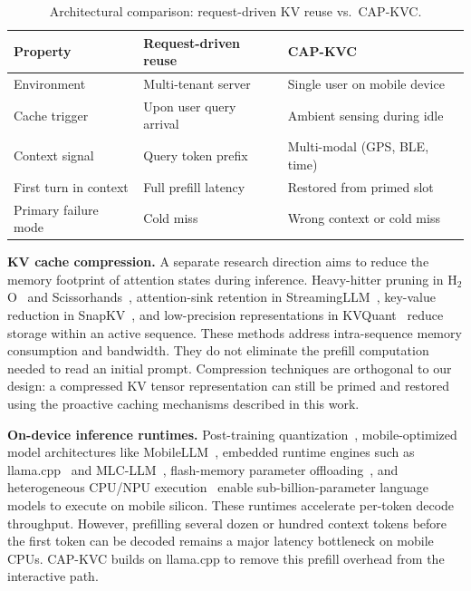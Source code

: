 \documentclass[conference]{IEEEtran}
\begin{document}
\begin{table}[t]
\centering
\caption{Architectural comparison: request-driven KV reuse vs.\ CAP-KVC.}
\label{tab:positioning}
\footnotesize
\setlength{\tabcolsep}{3pt}
\begin{tabular}{@{}p{}p{}p{}@{}}
\toprule
Property & Request-driven reuse & CAP-KVC \\
\midrule
Environment & Multi-tenant server & Single user on mobile device \\
Cache trigger & Upon user query arrival & Ambient sensing during idle \\
Context signal & Query token prefix & Multi-modal (GPS, BLE, time) \\
First turn in context & Full prefill latency & Restored from primed slot \\
Primary failure mode & Cold miss & Wrong context or cold miss \\
\bottomrule
\end{tabular}
\end{table}

\textbf{KV cache compression.}
A separate research direction aims to reduce the memory footprint of attention states during inference. Heavy-hitter pruning in H$_2$O~\cite{h2o} and Scissorhands~\cite{scissorhands}, attention-sink retention in StreamingLLM~\cite{streamingllm}, key-value reduction in SnapKV~\cite{snapkv}, and low-precision representations in KVQuant~\cite{kvquant} reduce storage within an active sequence. These methods address intra-sequence memory consumption and bandwidth. They do not eliminate the prefill computation needed to read an initial prompt. Compression techniques are orthogonal to our design: a compressed KV tensor representation can still be primed and restored using the proactive caching mechanisms described in this work.

\textbf{On-device inference runtimes.}
Post-training quantization~\cite{dettmers2022,frantar2022}, mobile-optimized model architectures like MobileLLM~\cite{mobilellm}, embedded runtime engines such as llama.cpp~\cite{llamacpp} and MLC-LLM~\cite{mlcllm}, flash-memory parameter offloading~\cite{llminaflash}, and heterogeneous CPU/NPU execution~\cite{powerinfer2} enable sub-billion-parameter language models to execute on mobile silicon. These runtimes accelerate per-token decode throughput. However, prefilling several dozen or hundred context tokens before the first token can be decoded remains a major latency bottleneck on mobile CPUs. CAP-KVC builds on llama.cpp to remove this prefill overhead from the interactive path.
\end{document}
